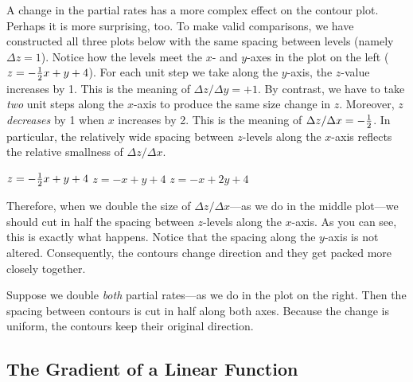 {{{{	A change in the partial rates has a more complex effect on the contour plot.  Perhaps it is more surprising, too.  To make valid comparisons, we have constructed all three plots below with the same spacing between levels (namely $\Delta z = 1$).  Notice how the levels meet the $x$- and $y$-axes in the plot on the left ($z = -{1 \over 2}x + y +4$).  
For each unit step we take along the $y$-axis, the $z$-value increases by 1.  This is the meaning of $\Delta z/\Delta y = +1$.  By contrast, we have to take {\em two\/} unit steps along the $x$-axis to produce the same size change in $z$.  Moreover, $z$ {\em decreases\/} by 1 when $x$ increases by 2.  This is the meaning of $\Delta z/\Delta x = -{1 \over 2}$.   In particular, the relatively wide spacing between $z$-levels along the $x$-axis reflects the relative smallness of $\Delta z/\Delta x$.
 


\vspace{13pt}
\vspace{138pt}

{\small
	\noindent
	\hspace{20pt}
	$z = -{\textstyle {1 \over 2}} x  + y + 4$
	\hspace{77pt}
	$z = -x + y + 4$
	\hspace{69pt}
	\mbox{$z = -x + 2y + 4$}
}
 \vspace{-6pt}

	Therefore, when we double the size of $\Delta z/\Delta x$---as we do in the middle plot---we should cut in half 
		the spacing between $z$-levels along the $x$-axis.  As you can see, this is exactly what happens.  Notice that the spacing along the $y$-axis is not altered.  Consequently, the contours change direction and they get packed more closely together.  

	Suppose we double {\em both\/} partial rates---as we do in the plot on the right.  Then the spacing between contours is cut in half along both axes.  Because the change is uniform, the contours keep their original direction.  


\subsection{The Gradient of a Linear Function}

}}}}
